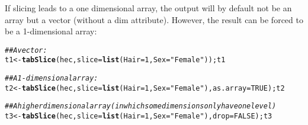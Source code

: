 \documentclass[10pt]{article}\usepackage[]{graphicx}\usepackage[]{xcolor}
\makeatletter
\newcommand{\hlnum}[1]{\textcolor[rgb]{0.686,0.059,0.569}{#1}}%
\newcommand{\hlstr}[1]{\textcolor[rgb]{0.192,0.494,0.8}{#1}}%
\newcommand{\hlcom}[1]{\textcolor[rgb]{0.678,0.584,0.686}{\textit{#1}}}%
\newcommand{\hlstd}[1]{\textcolor[rgb]{0.345,0.345,0.345}{#1}}%
\newcommand{\hlkwb}[1]{\textcolor[rgb]{0.69,0.353,0.396}{#1}}%
\newcommand{\hlkwc}[1]{\textcolor[rgb]{0.333,0.667,0.333}{#1}}%
\newcommand{\hlkwd}[1]{\textcolor[rgb]{0.737,0.353,0.396}{\textbf{#1}}}%
\newenvironment{kframe}{%
 \def\at@end@of@kframe{}%
 \ifinner\ifhmode%
  \def\at@end@of@kframe{\end{minipage}}%
  \begin{minipage}{\columnwidth}%
 \fi\fi%
 \def\FrameCommand##1{\hskip\@totalleftmargin \hskip-\fboxsep
 \colorbox{shadecolor}{##1}\hskip-\fboxsep
     \hskip-\linewidth \hskip-\@totalleftmargin \hskip\columnwidth}%
 \MakeFramed {\advance\hsize-\width
   \@totalleftmargin\z@ \linewidth\hsize
   \@setminipage}}%
 {\par\unskip\endMakeFramed%
 \at@end@of@kframe}
\newenvironment{knitrout}{}{} %
\makeatother
\begin{document}
If slicing leads to a one dimensional array, the output will by
default not be an array but a vector (without a dim attribute). However, 
the result can be forced to be a 1-dimensional array:

\begin{knitrout}\small
{}\color{fgcolor}\begin{kframe}
\begin{alltt}
\hlcom{## A vector:}
\hlstd{t1} \hlkwb{<-} \hlkwd{tabSlice}\hlstd{(hec,} \hlkwc{slice}\hlstd{=}\hlkwd{list}\hlstd{(}\hlkwc{Hair}\hlstd{=}\hlnum{1}\hlstd{,} \hlkwc{Sex}\hlstd{=}\hlstr{"Female"}\hlstd{)); t1}
\end{alltt}


{\ttfamily\noindent\bfseries{}}

{\ttfamily\noindent\bfseries\color{errorcolor}{\#\# Error in eval(expr, envir, enclos): object 't1' not found}}\begin{alltt}
\hlcom{## A 1-dimensional array:}
\hlstd{t2} \hlkwb{<-} \hlkwd{tabSlice}\hlstd{(hec,} \hlkwc{slice}\hlstd{=}\hlkwd{list}\hlstd{(}\hlkwc{Hair}\hlstd{=}\hlnum{1}\hlstd{,} \hlkwc{Sex}\hlstd{=}\hlstr{"Female"}\hlstd{),} \hlkwc{as.array}\hlstd{=}\hlnum{TRUE}\hlstd{); t2}
\end{alltt}


{\ttfamily\noindent\bfseries{}}

{\ttfamily\noindent\bfseries\color{errorcolor}{\#\# Error in eval(expr, envir, enclos): object 't2' not found}}\begin{alltt}
\hlcom{## A higher dimensional array (in which some dimensions only have one level)}
\hlstd{t3} \hlkwb{<-} \hlkwd{tabSlice}\hlstd{(hec,} \hlkwc{slice}\hlstd{=}\hlkwd{list}\hlstd{(}\hlkwc{Hair}\hlstd{=}\hlnum{1}\hlstd{,} \hlkwc{Sex}\hlstd{=}\hlstr{"Female"}\hlstd{),} \hlkwc{drop}\hlstd{=}\hlnum{FALSE}\hlstd{); t3}
\end{alltt}


{\ttfamily\noindent\bfseries{}}

{\ttfamily\noindent\bfseries\color{errorcolor}{\#\# Error in eval(expr, envir, enclos): object 't3' not found}}\end{kframe}
\end{knitrout}
\end{document}
